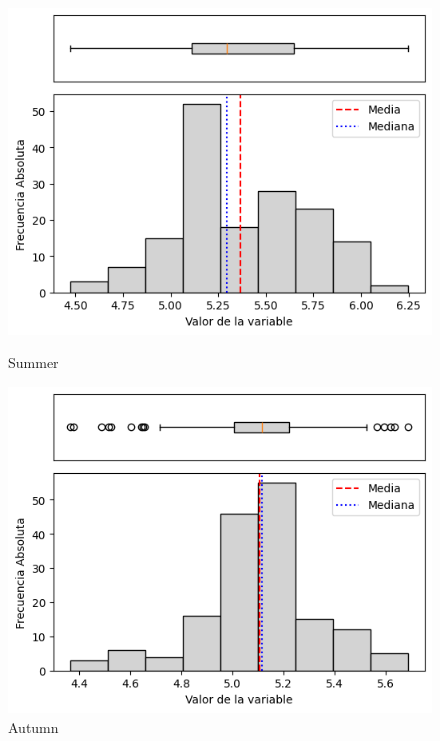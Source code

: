 \begin{figure}[H]
\centering
\begin{minipage}{0.30\textwidth}
  \includegraphics[width=\linewidth]{resultados/por_estacion_del_anio/boxplot_clases_por_estacion/Andahuaylas/PET_HistBoxplot_Summer.png}
  \caption*{Summer}
\end{minipage}
\hfill
\begin{minipage}{0.30\textwidth}
  \includegraphics[width=\linewidth]{resultados/por_estacion_del_anio/boxplot_clases_por_estacion/Andahuaylas/PET_HistBoxplot_Autumn.png}
  \caption*{Autumn}
\end{minipage}

\vspace{0.2cm}


\end{figure}
